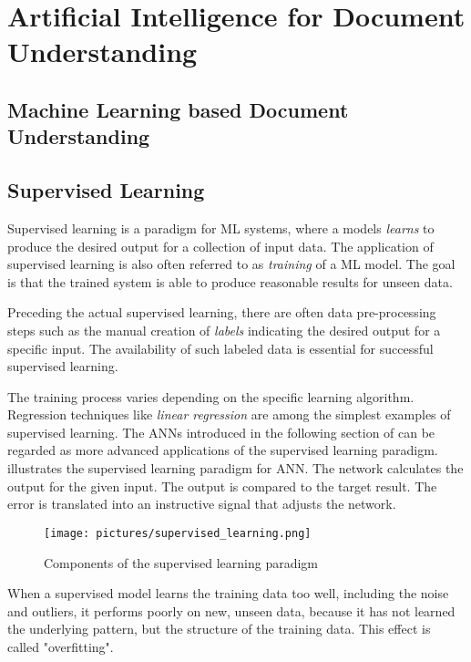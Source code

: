 \section{Artificial Intelligence for Document Understanding}
\subsection{Machine Learning based Document Understanding}

\subsection{Supervised Learning}
Supervised learning is a paradigm for \ac{ML} systems, where a models \textit{learns} to produce the desired output for a collection of input data. The application of supervised learning is also often referred to as \textit{training} of a \ac{ML} model. The goal is that the trained system is able to produce reasonable results for unseen data.
\cite{haykin2009neural,knudsen1994supervised}

Preceding the actual supervised learning, there are often data pre-processing steps such as the manual creation of \textit{labels} indicating the desired output for a specific input. The availability of such labeled data is essential for successful supervised learning.
\cite{haykin2009neural}

The training process varies depending on the specific learning algorithm.
Regression techniques like \textit{linear regression} are among the simplest examples of supervised learning. The \acp{ANN} introduced in the following section of can be regarded as more advanced applications of the supervised learning paradigm. 
 illustrates the supervised learning paradigm for \ac{ANN}. The network calculates the output for the given input. The output is compared to the target result. The error is translated into an instructive signal that adjusts the network. 
\cite{haykin2009neural,knudsen1994supervised}

\begin{figure}[ht]
    \centering 
    \texttt{[image: pictures/supervised\_learning.png]}
    \caption{Components of the supervised learning paradigm \cite{knudsen1994supervised}}
    \label{pic:supervised}    %
\end{figure}

When a supervised model learns the training data too well, including the noise and outliers, it performs poorly on new, unseen data, because it has not learned the underlying pattern, but the structure of the training data. This effect is called "overfitting".
\cite{haykin2009neural,knudsen1994supervised}

